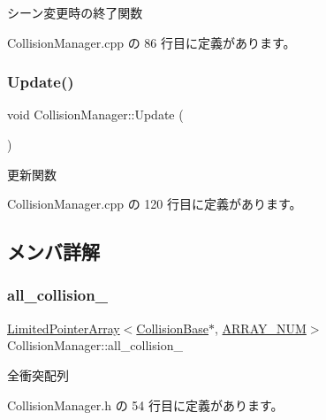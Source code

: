 シーン変更時の終了関数 



 Collision\+Manager.\+cpp の 86 行目に定義があります。

\mbox{\label{class_collision_manager_a23c21d077dbfd7ca86e7c0649d775dfc}} 
\subsubsection{\texorpdfstring{Update()}{Update()}}
{\footnotesize\ttfamily void Collision\+Manager\+::\+Update (\begin{DoxyParamCaption}{ }\end{DoxyParamCaption})}



更新関数 



 Collision\+Manager.\+cpp の 120 行目に定義があります。



\subsection{メンバ詳解}
\mbox{\label{class_collision_manager_a1be7aa8904688724543897d58b22a406}} 
\subsubsection{\texorpdfstring{all\+\_\+collision\+\_\+}{all\_collision\_}}
{\footnotesize\ttfamily \mbox{\hyperlink{class_limited_pointer_array}{Limited\+Pointer\+Array}}$<$\mbox{\hyperlink{class_collision_base}{Collision\+Base}}$\ast$, \mbox{\hyperlink{class_collision_manager_addbc64e1fa0b01f3be07c897887f44ec}{A\+R\+R\+A\+Y\+\_\+\+N\+UM}}$>$ Collision\+Manager\+::all\+\_\+collision\+\_\+\hspace{0.3cm}{\ttfamily [private]}}



全衝突配列 



 Collision\+Manager.\+h の 54 行目に定義があります。

